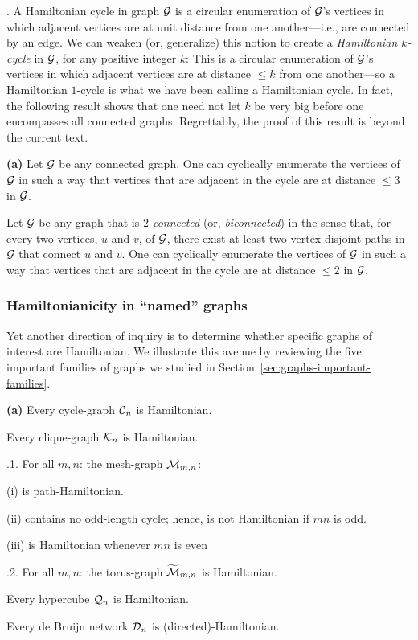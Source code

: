 .
A Hamiltonian cycle in graph $\mbox{$\cal G$}$ is a circular enumeration of $\mbox{$\cal G$}$'s
vertices in which adjacent vertices are at unit distance from one
another---i.e., are connected by an edge.  We can weaken (or,
generalize) this notion to create a {\it Hamiltonian $k$-cycle}
 in $\mbox{$\cal G$}$, for any positive integer
$k$: This is a circular enumeration of $\mbox{$\cal G$}$'s vertices in which adjacent
vertices are at distance $\leq k$ from one another---so a Hamiltonian
$1$-cycle is what we have been calling a Hamiltonian cycle.  In fact,
the following result shows that one need not let $k$ be very big
before one encompasses all connected graphs.  Regrettably, the proof
of this result is beyond the current text.

\begin{prop}
\label{thm:weak-Hamiltonianicity}
{\bf (a)} {\rm \cite{ChartrandK69}}
Let $\mbox{$\cal G$}$ be any connected graph.  One can cyclically enumerate the
vertices of $\mbox{$\cal G$}$ in such a way that vertices that are adjacent in the cycle
are at distance $\leq 3$ in $\mbox{$\cal G$}$.


 {\rm  \cite{Fleischner74}}
Let $\mbox{$\cal G$}$ be any graph that is {\em $2$-connected}
  (or, {\it
  biconnected}) in the sense that, for every two vertices, $u$ and $v$,
of $\mbox{$\cal G$}$, there exist at least two vertex-disjoint paths in $\mbox{$\cal G$}$ that
connect $u$ and $v$.  One can cyclically enumerate the vertices of $\mbox{$\cal G$}$
in such a way that vertices that are adjacent in the cycle are at
distance $\leq 2$ in $\mbox{$\cal G$}$.
\end{prop}

\subsubsection{Hamiltonianicity in ``named'' graphs}

Yet another direction of inquiry is to determine whether specific
graphs of interest are Hamiltonian.  We illustrate this avenue by
reviewing the five important families of graphs we studied in
Section~\ref{sec:graphs-important-families}.

\begin{prop}
\label{thm:named-graph-Hamiltonian}
{\bf (a)}
Every cycle-graph $\mbox{$\cal C$}_n$ is Hamiltonian.

Every clique-graph $\mbox{$\cal K$}_n$ is Hamiltonian.

.1.
For all $m,n$: the mesh-graph $\mbox{$\cal M$}_{m,n}$:

(i)  is path-Hamiltonian.

(ii) contains no odd-length cycle; hence, is not Hamiltonian if $mn$
is odd.

(iii) is Hamiltonian whenever $mn$ is even 

.2.
For all $m,n$: the torus-graph $\widetilde{\mbox{$\cal M$}}_{m,n}$ is Hamiltonian.

Every hypercube $\mbox{$\cal Q$}_n$  is Hamiltonian.

Every de Bruijn network $\mbox{$\cal D$}_n$ is (directed)-Hamiltonian.
\end{prop}

